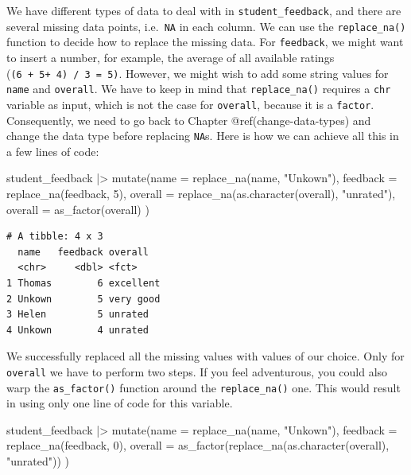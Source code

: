 \documentclass[
  letterpaper,
]{krantz}
\makeatletter
\newenvironment{Shaded}{\begin{snugshade}}{\end{snugshade}}
\newcommand{\AttributeTok}[1]{\textcolor[rgb]{0.40,0.45,0.13}{#1}}
\newcommand{\DecValTok}[1]{\textcolor[rgb]{0.68,0.00,0.00}{#1}}
\newcommand{\FunctionTok}[1]{\textcolor[rgb]{0.28,0.35,0.67}{#1}}
\newcommand{\NormalTok}[1]{\textcolor[rgb]{0.00,0.23,0.31}{#1}}
\newcommand{\SpecialCharTok}[1]{\textcolor[rgb]{0.37,0.37,0.37}{#1}}
\newcommand{\StringTok}[1]{\textcolor[rgb]{0.13,0.47,0.30}{#1}}
\newenvironment{kframe}{%
\medskip{}
\setlength{\fboxsep}{.8em}
 \def\at@end@of@kframe{}%
 \ifinner\ifhmode%
  \def\at@end@of@kframe{\end{minipage}}%
  \begin{minipage}{\columnwidth}%
 \fi\fi%
 \def\FrameCommand##1{\hskip\@totalleftmargin \hskip-\fboxsep
 \colorbox{shadecolor}{##1}\hskip-\fboxsep
     \hskip-\linewidth \hskip-\@totalleftmargin \hskip\columnwidth}%
 \MakeFramed {\advance\hsize-\width
   \@totalleftmargin\z@ \linewidth\hsize
   \@setminipage}}%
 {\par\unskip\endMakeFramed%
 \at@end@of@kframe}
\renewenvironment{Shaded}{\begin{kframe}}{\end{kframe}}
\makeatother
\begin{document}
We have different types of data to deal with in
\texttt{student\_feedback}, and there are several missing data points,
i.e.~\texttt{NA} in each column. We can use the \texttt{replace\_na()}
function to decide how to replace the missing data. For
\texttt{feedback}, we might want to insert a number, for example, the
average of all available ratings (\texttt{(6\ +\ 5+\ 4)\ /\ 3\ =\ 5)}.
However, we might wish to add some string values for \texttt{name} and
\texttt{overall}. We have to keep in mind that \texttt{replace\_na()}
requires a \texttt{chr} variable as input, which is not the case for
\texttt{overall}, because it is a \texttt{factor}. Consequently, we need
to go back to Chapter @ref(change-data-types) and change the data type
before replacing \texttt{NA}s. Here is how we can achieve all this in a
few lines of code:

\begin{Shaded}
\begin{Highlighting}[]
\NormalTok{student\_feedback }\SpecialCharTok{|\textgreater{}}
  \FunctionTok{mutate}\NormalTok{(}\AttributeTok{name =} \FunctionTok{replace\_na}\NormalTok{(name, }\StringTok{"Unkown"}\NormalTok{),}
         \AttributeTok{feedback =} \FunctionTok{replace\_na}\NormalTok{(feedback, }\DecValTok{5}\NormalTok{),}
         \AttributeTok{overall =} \FunctionTok{replace\_na}\NormalTok{(}\FunctionTok{as.character}\NormalTok{(overall), }\StringTok{"unrated"}\NormalTok{),}
         \AttributeTok{overall =} \FunctionTok{as\_factor}\NormalTok{(overall)}
\NormalTok{         )}
\end{Highlighting}
\end{Shaded}

\begin{verbatim}
# A tibble: 4 x 3
  name   feedback overall  
  <chr>     <dbl> <fct>    
1 Thomas        6 excellent
2 Unkown        5 very good
3 Helen         5 unrated  
4 Unkown        4 unrated  
\end{verbatim}

We successfully replaced all the missing values with values of our
choice. Only for \texttt{overall} we have to perform two steps. If you
feel adventurous, you could also warp the \texttt{as\_factor()} function
around the \texttt{replace\_na()} one. This would result in using only
one line of code for this variable.

\begin{Shaded}
\begin{Highlighting}[]
\NormalTok{student\_feedback }\SpecialCharTok{|\textgreater{}}
  \FunctionTok{mutate}\NormalTok{(}\AttributeTok{name =} \FunctionTok{replace\_na}\NormalTok{(name, }\StringTok{"Unkown"}\NormalTok{),}
         \AttributeTok{feedback =} \FunctionTok{replace\_na}\NormalTok{(feedback, }\DecValTok{0}\NormalTok{),}
         \AttributeTok{overall =} \FunctionTok{as\_factor}\NormalTok{(}\FunctionTok{replace\_na}\NormalTok{(}\FunctionTok{as.character}\NormalTok{(overall), }\StringTok{"unrated"}\NormalTok{))}
\NormalTok{         )}
\end{Highlighting}
\end{Shaded}
\end{document}
